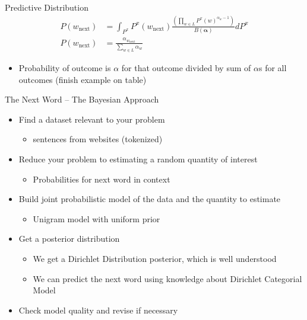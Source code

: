 \documentclass[11pt]{beamer}
\begin{document}
	\begin{frame}{Predictive Distribution}
		\begin{align*}
			P(w_{\text{next}}) & = \int_{P^x} P^x(w_{\text{next}}) \frac{\left(\prod_{w \in L} P^{x}(w)^{\alpha_{w}-1}\right)}{B(\boldsymbol{\alpha})} d P^x \\
			P(w_{\text{next}}) & = \frac{\alpha_{w_{\text{next}}}}{\sum_{w \in L} \alpha_{w}}
		\end{align*}
			
		\vspace{10pt}
		\begin{itemize}
			\item Probability of outcome is $\alpha$ for that outcome divided by sum of $\alpha$s for all outcomes (finish example on table)
		\end{itemize}
		 
	\end{frame}
	
	\begin{frame}{The Next Word -- The Bayesian Approach}
		\centering
		\begin{itemize}
			\item Find a dataset relevant to your problem
			\begin{itemize}
				\item sentences from websites (tokenized) \checkmark
			\end{itemize}
			\item Reduce your problem to estimating a random quantity of interest
			\begin{itemize}
				\item Probabilities for next word in context \checkmark 
			\end{itemize}
			\item Build joint probabilistic model of the data and the quantity to estimate
			\begin{itemize}
				\item Unigram model with uniform prior \checkmark
			\end{itemize}
			\item<2-> Get a posterior distribution
			\begin{itemize}
				\item<2-> We get a Dirichlet Distribution posterior, which is well understood \checkmark
				\item<2-> We can predict the next word using knowledge about Dirichlet Categorial Model \checkmark
			\end{itemize}
			\item<3-> Check model quality and revise if necessary
		\end{itemize}
	\end{frame}
	
\end{document}
